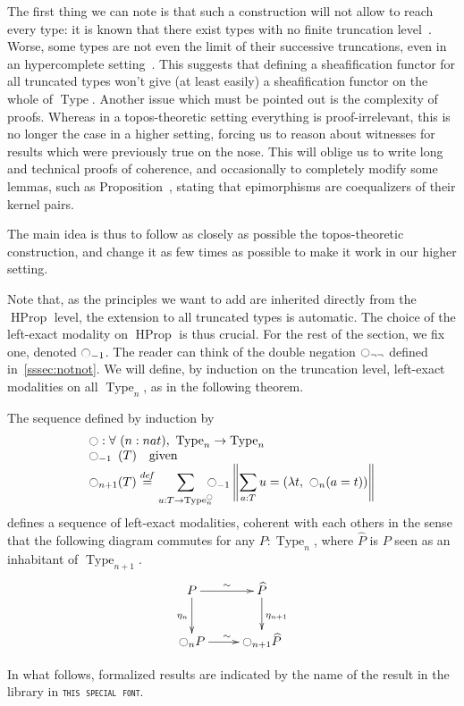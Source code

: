 \documentclass[notfinal]{jfrarticle}
\DeclareMathOperator{\Type}{Type}
\DeclareMathOperator{\HProp}{HProp}
\newcommand \defeq {\overset{de\hspace{-0.2ex}f}{=}}
\newcommand{\modal}{\ensuremath{\ocircle}}
\newcommand{\code}[1]{\texttt{#1}}
\begin{document}
The first thing we can note is that such a construction will not allow
to reach every type: it is known that there exist types with no finite
truncation level~\cite[Example 8.8.6]{hottbook}. Worse, some
types are not even the limit of their successive truncations, even in an
hypercomplete setting~\cite{morelvv}. This suggests that defining a
sheafification functor for all truncated types won't give (at least
easily) a sheafification functor on the whole of $\Type$.  Another
issue which must be pointed out is the complexity of proofs. Whereas
in a topos-theoretic setting everything is proof-irrelevant, this is
no longer the case in a higher setting, forcing us to reason about
witnesses for results which were previously true on the nose. This
will oblige us to write long and technical proofs of coherence, and
occasionally to completely modify some lemmas, such as
Proposition~\cite[Theorem IV.7.8]{maclanemoerdijk}, stating that
epimorphisms are coequalizers of their kernel pairs.

The main idea is thus to follow as closely as possible the
topos-theoretic construction, and change it as few times as possible to
make it work in our higher setting.

Note that, as the principles we want to add are inherited directly
from the $\HProp$ level, the extension to all truncated types is
automatic. The choice of the left-exact modality on $\HProp$ is thus
crucial. For the rest of the section, we fix one, denoted
$\modal_{-1}$. The reader can think of the double negation
$\modal_{\lnot\lnot}$ defined in~\ref{sssec:notnot}. We will define,
by induction on the truncation level, left-exact modalities on all
$\Type_n$, as in the following theorem.

\begin{thm}\label{thm:main}
  The sequence defined by induction by
  \[ \begin{array}{l}
   \modal : \forall \ (n : nat), \ \Type_n \to \Type_n 
   \\
    \modal_{-1\phantom{n}}(T) \quad\text{given} \\

      \displaystyle{\modal_{n+1}(T)} \defeq  
      \displaystyle{\sum_{u:T \to \Type_n^\modal} \!\!\!\!\modal_{-1} 
      \left\|
      \sum_{a:T} u= (\lambda t,~\modal_n (a=t))
      \right\|}
    \end{array}
\]
defines a sequence of left-exact modalities, coherent with each others
in the sense that the following diagram commutes for any $P:\Type_n$,
where $\hat P$ is $P$ seen as an inhabitant of $\Type_{n+1}$.
\[ \xymatrix{
    P \ar@{->}^{\sim}[r] \ar[d]_{\eta_{n}} & \widehat P \ar[d]^{\eta_{n+1}} \\
    \modal_{n} P \ar@{->}^{\sim}[r] & \modal_{n+1} \widehat P 
  } \]
\end{thm}
In what follows, formalized results are indicated by the name of the
result in the library in \code{\textsc{this special font}}.
\end{document}
